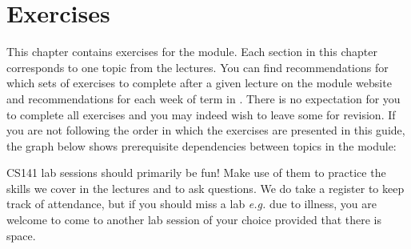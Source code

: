 \documentclass[12pt,a4paper,twoside,fleqn]{report}
\author{Michael B. Gale}
\begin{document}
\pagestyle{empty}

\renewcommand{\headrulewidth}{0pt}
\renewcommand{\footrulewidth}{0pt}



\cleardoublepage

\fancyhf{}
\fancyfoot[LE,RO]{\thepage}
\pagestyle{fancy}
\thispagestyle{fancy}

\tableofcontents


\cleardoublepage
{}









\cleardoublepage
\chapter{Exercises}

This chapter contains exercises for the module. Each section in this chapter corresponds to one topic from the lectures. You can find recommendations for which sets of exercises to complete after a given lecture on the module website and recommendations for each week of term in . There is no expectation for you to complete all exercises and you may indeed wish to leave some for revision. If you are not following the order in which the exercises are presented in this guide, the graph below shows prerequisite dependencies between topics in the module:



CS141 lab sessions should primarily be fun! Make use of them to practice the skills we cover in the lectures and to ask questions. We do take a register to keep track of attendance, but if you should miss a lab \emph{e.g.} due to illness, you are welcome to come to another lab session of your choice provided that there is space.

 \newpage
 \newpage
 \newpage
 \newpage
 \newpage
 \newpage
 \newpage
 \newpage
 \newpage
 \newpage
 \newpage
 \newpage
 \newpage
 \newpage
 \newpage
 \newpage  
  
\end{document}
